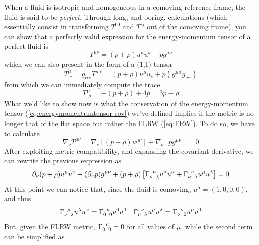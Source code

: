 \par When a fluid is isotropic and homogeneous in a comoving reference frame, the fluid is said to be \emph{perfect}. Through long, and boring, calculations (which essentially consist in transforming $T^{00}$ and $T^{ij}$ out of the comoving frame), you can show that a perfectly valid expression for the energy-momentum tensor of a perfect fluid is 
\begin{equation}
    T^{\mu\nu} = (p+\rho)u^{\mu}u^{\nu} + pg^{\mu\nu}
    \label{eq:energymomentumtensor-cov}
\end{equation}
which we can also present in the form of a (1,1) tensor
\begin{equation}
    T^{\mu}_{\;\nu} = g_{\alpha\nu}T^{\mu\alpha} = (p+\rho)u^{\mu}u_{\nu} + p(g^{\mu\alpha}g_{\nu\alpha})
\end{equation}
from which we can immediately compute the trace
\begin{equation}
    T^{\mu}_{\;\mu} = -(p+\rho) + 4p = 3p-\rho
\end{equation}
What we'd like to show now is what the conservation of the energy-momentum tensor (\ref{eq:energymomentumtensor-cov}) we've defined implies if the metric is no longer that of the flat space but rather the FLRW (\ref{eq:FRW}). To do so, we have to calculate
\begin{equation}
    \nabla_{\nu}T^{\mu\nu} = \nabla_{\nu}\left[(p+\rho)u^{\mu\nu}\right] + \nabla_{\nu}\left[pg^{\mu\nu}\right] = 0
\end{equation}
After exploiting metric compatibility, and expanding the covariant derivative, we can rewrite the previous expression as
\begin{equation}
    \partial_{\nu}(p+\rho)u^{\mu}u^{\nu} + (\partial_{\nu}p) g^{\mu\nu} + (p+\rho)\left[\Gamma_{\nu\;\;\lambda}^{\;\;\mu}u^{\lambda}u^{\nu}+\Gamma_{\nu\;\;\lambda}^{\;\;\nu}u^{\mu}u^{\lambda}\right] = 0
\end{equation}
At this point we can notice that, since the fluid is comoving, $u^{\mu} = (1,0,0,0)$, and thus
\begin{equation}
    \Gamma_{\nu\;\;\lambda}^{\;\;\mu}u^{\lambda}u^{\nu} = \Gamma_{0\;\;0}^{\;\;\mu}u^{0}u^{0} \quad \Gamma_{\nu\;\;\lambda}^{\;\;\nu}u^{\mu}u^{\lambda} = \Gamma_{\nu\;\;0}^{\;\;\nu}u^{\mu}u^{0} 
\end{equation}
But, given the FLRW metric, $\Gamma_{0\;\;0}^{\;\;\mu} = 0$ for all values of $\mu$, while the second term can be simplified as
